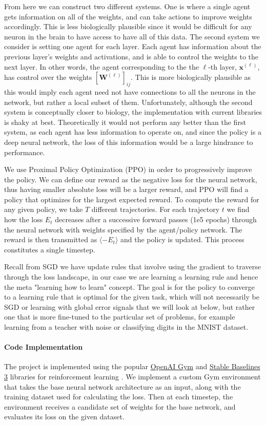 \documentclass{article}
\def\*#1{\mathbf{#1}}
\begin{document}
From here we can construct two different
systems. One is where a single agent gets information on all of the weights,
and can take actions to improve weights accordingly. This is less biologically plausible since it would be difficult
for any neuron in the brain to have access to have all of this data. The second system we consider is setting one agent
for each layer. Each agent has information about the previous layer's weights and activations, and is able to control
the weights to the next layer. In other words, the agent corresponding to the the $\ell$-th layer, $\*x^{(\ell)}$, has control over the weights 
$[\*W^{(\ell)}]_{ij}$. This is more biologically plausible as this would imply each agent need not have connections to all the neurons in 
the network, but rather a local subset of them. Unfortunately, although the second system is conceptually closer to biology, the implementation
with current libraries is shaky at best. Theoretically it would not perform any better than the first system, as each agent has less information
to operate on, and since the policy is a deep neural network, the loss of this information would be a large hindrance to performance.

We use Proximal Policy Optimization (PPO) in order to progressively improve the policy. We can define
our reward as the negative loss for the neural network, thus having smaller absolute loss will be a larger reward, and
PPO will find a policy that optimizes for the largest expected reward. To compute the reward for any given policy, we 
take $T$ different trajectories. For each trajectory $t$ we find how the loss $E_t$ 
decreases after a successive forward passes (1e5 epochs) through the neural 
network with weights specified by the agent/policy network. The reward is 
then transmitted as $\langle - E_t \rangle$ and the policy is updated. This process constitutes a single timestep.

Recall from SGD we have update rules that involve using the gradient to traverse through the loss landscape,
in our case we are learning a learning rule and hence the meta "learning how to learn" concept. The goal is for
the policy to converge to a learning rule that is optimal for the given task, which will not necessarily be SGD
or learning with global error signals that we will look at below, but rather one that is more fine-tuned to the particular
set of problems, for example learning from a teacher with noise or classifying digits in the MNIST dataset.


\paragraph{Code Implementation} The project is implemented using the popular \href{https://www.gymlibrary.dev/}{OpenAI Gym} and \href{https://stable-baselines3.readthedocs.io/en/master/}{Stable Baselines 3} libraries for reinforcement learning \cite{openaigym, sb3}. We implement a custom Gym environment that takes the base neural network architecture as an input, along with the training dataset used for calculating the loss. Then at each timestep, the environment receives a candidate set of weights for the base network, and evaluates its loss on the given dataset.
\end{document}
